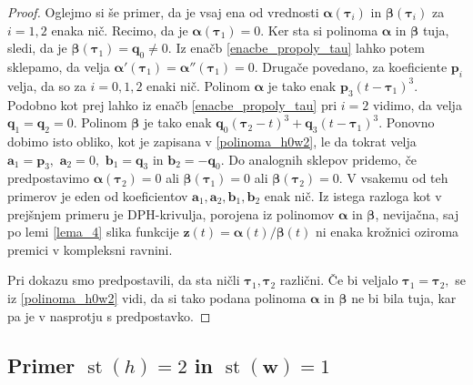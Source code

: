\documentclass[12pt,a4paper,twoside]{article}
\theoremstyle{definition} %
\theoremstyle{plain} %
\theoremstyle{primerstyle}
\numberwithin{equation}{section}  %
\newcommand{\aV}{\mathbf{a}}
\newcommand{\bV}{\mathbf{b}}
\newcommand{\pV}{\mathbf{p}}
\newcommand{\qV}{\mathbf{q}}
\newcommand{\wV}{\mathbf{w}}
\newcommand{\zV}{\mathbf{z}}
\newcommand{\balpha}{\boldsymbol \alpha}
\newcommand{\bbeta}{\boldsymbol \beta}
\newcommand{\btau}{\boldsymbol \tau}
\DeclareMathOperator{\st}{st}
\begin{document}
\begin{proof}
	Oglejmo si še primer, da je vsaj ena od vrednosti $\balpha(\btau_i)$ in $\bbeta(\btau_i)$ za $i=1,2$ enaka nič. Recimo, da je $\balpha(\btau_1)=0.$ Ker sta si polinoma $\balpha$ in $\bbeta$ tuja, sledi, da je $\bbeta(\btau_1)=\qV_0\neq0.$ Iz enačb \eqref{enacbe_propoly_tau} lahko potem sklepamo, da velja $\balpha'(\btau_1)=\balpha''(\btau_1)=0.$ Drugače povedano, za koeficiente $\pV_i$ velja, da so za $i=0,1,2$ enaki nič. Polinom $\balpha$ je tako enak $\pV_3(t-\btau_1)^3.$ Podobno kot prej lahko iz enačb \eqref{enacbe_propoly_tau} pri $i=2$ vidimo, da velja $\qV_1=\qV_2=0.$ Polinom $\bbeta$ je tako enak $\qV_0(\btau_2-t)^3+\qV_3(t-\btau_1)^3.$ Ponovno dobimo isto obliko, kot je zapisana v \eqref{polinoma_h0w2}, le da tokrat velja $\aV_1=\pV_3,$ $\aV_2=0,$ $\bV_1=\qV_3$ in $\bV_2=-\qV_0.$ Do analognih sklepov pridemo, če predpostavimo $\balpha(\btau_2)=0$ ali $\bbeta(\btau_1)=0$ ali $\bbeta(\btau_2)=0.$ V vsakemu od teh primerov je eden od koeficientov $\aV_1,\aV_2,\bV_1,\bV_2$ enak nič. Iz istega razloga kot v prejšnjem primeru je DPH-krivulja, porojena iz polinomov $\balpha$ in $\bbeta$, nevijačna, saj po lemi \ref{lema_4} slika funkcije $\zV(t)=\balpha(t)/\bbeta(t)$ ni enaka krožnici oziroma premici v kompleksni ravnini.
	
	Pri dokazu smo predpostavili, da sta ničli $\btau_1,\btau_2$ različni. Če bi veljalo $\btau_1=\btau_2,$ se iz \eqref{polinoma_h0w2} vidi, da si tako podana polinoma $\balpha$ in $\bbeta$ ne bi bila tuja, kar pa je v nasprotju s predpostavko.
\end{proof}

\subsection{Primer \texorpdfstring{$\st(h)=2$}{st(h)=2} in \texorpdfstring{$\st(\wV)=1$}{st(w)=1}}
\label{locevanje_h2w1}
\end{document}
